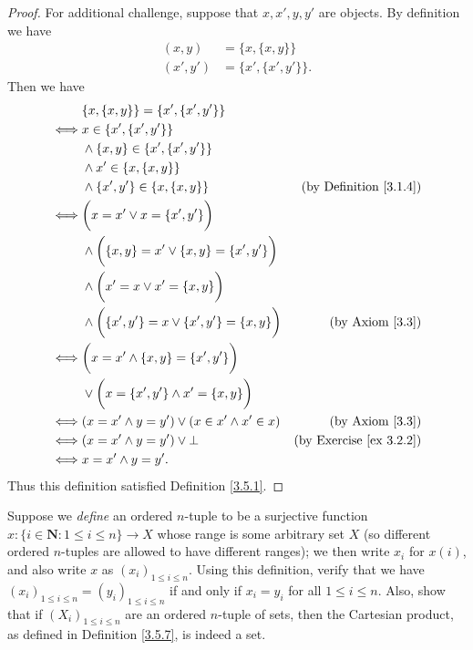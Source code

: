 \begin{proof}
For additional challenge, suppose that \(x, x', y, y'\) are objects.
By definition we have
\begin{align*}
(x, y) &= \{x, \{x, y\}\} \\
(x', y') &= \{x', \{x', y'\}\}.
\end{align*}
Then we have
\begin{align*}
& \{x, \{x, y\}\} = \{x', \{x', y'\}\} \\
\iff & x \in \{x', \{x', y'\}\} \\
& \land \{x, y\} \in \{x', \{x', y'\}\} \\
& \land x' \in \{x, \{x, y\}\} \\
& \land \{x', y'\} \in \{x, \{x, y\}\} & \text{(by Definition \ref{3.1.4})} \\
\iff & \bigg(x = x' \lor x = \{x', y'\}\bigg) \\
& \land \bigg(\{x, y\} = x' \lor \{x, y\} = \{x', y'\}\bigg) \\
& \land \bigg(x' = x \lor x' = \{x, y\}\bigg) \\
& \land \bigg(\{x', y'\} = x \lor \{x', y'\} = \{x, y\}\bigg) & \text{(by Axiom \ref{3.3})} \\
\iff & \bigg(x = x' \land \{x, y\} = \{x', y'\}\bigg) \\
& \lor \bigg(x = \{x', y'\} \land x' = \{x, y\}\bigg) \\
\iff & (x = x' \land y = y') \lor (x \in x' \land x' \in x) & \text{(by Axiom \ref{3.3})} \\
\iff & (x = x' \land y = y') \lor \bot & \text{(by Exercise \ref{ex 3.2.2})} \\
\iff & x = x' \land y = y'.
\end{align*}
Thus this definition satisfied Definition \ref{3.5.1}.
\end{proof}

\begin{exercise}\label{ex 3.5.2}
Suppose we \emph{define} an ordered \(n\)-tuple to be a surjective function \(x : \{i \in \mathbf{N} : 1 \leq i \leq n\} \to X\) whose range is some arbitrary set \(X\) (so different ordered \(n\)-tuples are allowed to have different ranges);
we then write \(x_i\) for \(x(i)\), and also write \(x\) as \((x_i)_{1 \leq i \leq n}\).
Using this definition, verify that we have \((x_i)_{1 \leq i \leq n} = (y_i)_{1 \leq i \leq n}\) if and only if \(x_i = y_i\) for all \(1 \leq i \leq n\).
Also, show that if \((X_i)_{1 \leq i \leq n}\) are an ordered \(n\)-tuple of sets, then the Cartesian product, as defined in Definition \ref{3.5.7}, is indeed a set.
\end{exercise}

